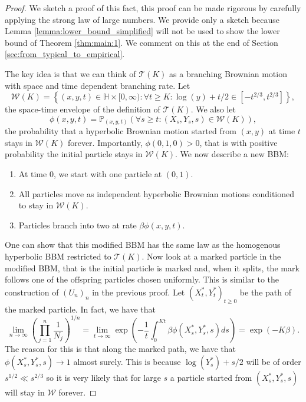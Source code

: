 \documentclass{article}
\theoremstyle{definition}
\numberwithin{equation}{section}
\numberwithin{thm}{section}
\newcommand*{\PP}{\ensuremath{\mathbb{P}}}	        	%
\newcommand*{\HH}{\ensuremath{\mathbb{H}}}	        	%
\begin{document}
\begin{proof}
    We sketch a proof of this fact, this proof can be made rigorous by carefully applying the strong law of large numbers. We provide only a sketch because Lemma \ref{lemma:lower_bound_simplified} will not be used to show the lower bound of Theorem \ref{thm:main:1}. We comment on this at the end of Section \ref{sec:from_typical_to_empirical}.
    
    The key idea is that we can think of $\mathcal{T}(K)$ as a branching Brownian motion with space and time dependent branching rate. Let
    \begin{equation*}
        \mathcal{W}(K) = \left\{(x,y,t) \in \HH \times [0,\infty): \forall t\geq K: \log(y)+t/2\in [-t^{2/3},t^{2/3}]\right\},
    \end{equation*}
    the space-time envelope of the definition of $\mathcal{T}(K)$. We also let 
    \begin{equation*}
        \phi(x,y,t)=\PP_{(x,y,t)}\left(\forall s\geq t: (X_s,Y_s, s)\in \mathcal{W}(K)\right),
    \end{equation*}
    the probability that a hyperbolic Brownian motion started from $(x,y)$ at time $t$ stays in $\mathcal{W}(K)$ forever. Importantly, $\phi(0,1,0)> 0$, that is with positive probability the initial particle stays in $\mathcal{W}(K)$. We now describe a new BBM:
    \begin{enumerate}
        \item At time $0$, we start with one particle at $(0,1)$. 
        \item All particles move as independent hyperbolic Brownian motions conditioned to stay in $\mathcal{W}(K)$.
        \item Particles branch into two at rate $\beta \phi(x,y,t)$.
    \end{enumerate}
    One can show that this modified BBM has the {same} law as the homogenous hyperbolic BBM restricted to $\mathcal{T}(K)$. Now look at a marked particle in the modified BBM, that is the initial particle is marked and{,} when it splits{,} the mark follows one of the offspring particles chosen uniformly. This is similar to the construction of $(U_n)_n$ in the previous proof. Let $(X_t^*,Y_t^*)_{t\geq 0}$ be the path of the marked particle. In fact, we have that 
    \begin{equation*}
        \lim_{n \to \infty}\left(\prod_{j=1}^n \frac{1}{N_j}\right)^{1/n} = \lim_{t \to \infty} \exp\left(-\frac{1}{t}\int_0^{Kt} \beta \phi(X_s^*,Y_s^*,s)ds\right) = \exp\left(-K\beta\right).
    \end{equation*}
    The reason for this is that along the marked path, we have that $\phi(X_s^*,Y_s^*,s)\to 1$ almost surely. This is because $\log(Y_s^*)+s/2$ will be of order $ s^{1/2}\ll s^{2/3}$ so it is very likely that for large $s$ a particle started from $(X_s^*,Y_s^*,s)$ will stay in $\mathcal{W}$ forever. 
\end{proof}
\end{document}
